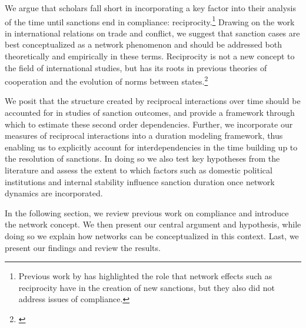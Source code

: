 We argue that scholars fall short in incorporating a key factor into their analysis of the time until sanctions end in compliance: reciprocity.\footnote{Previous work by \cite{cranmer2014reciprocity} has highlighted the role that network effects such as reciprocity have in the creation of new sanctions, but they also did not address issues of compliance.} Drawing on the work in international relations on trade and conflict, we suggest that sanction cases are best conceptualized as a network phenomenon and should be addressed both theoretically and empirically in these terms. Reciprocity is not a new concept to the field of international studies, but has its roots in previous theories of cooperation and the evolution of norms between states.\footnote{\cite{richardsonai:1960,choucri:north:1972,goldstein1991reciprocity,ward1992reciprocity}} 


We posit that the structure created by reciprocal interactions over time should be accounted for in studies of sanction outcomes, and provide a framework through which to estimate these second order dependencies. Further, we incorporate our measures of reciprocal interactions into a duration modeling framework, thus enabling us to explicitly account for interdependencies in the time building up to the resolution of sanctions. In doing so we also test key hypotheses from the literature and assess the extent to which factors such as domestic political institutions and internal stability influence sanction duration once network dynamics are incorporated.  

In the following section, we review previous work on compliance and introduce the network concept. We then present our central argument and hypothesis, while doing so we explain how networks can be conceptualized in this context. Last, we present our findings and review the results.

